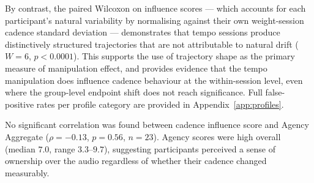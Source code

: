 By contrast, the paired Wilcoxon on influence scores --- which
accounts for each participant's natural variability by normalising
against their own weight-session cadence standard deviation ---
demonstrates that tempo sessions produce distinctively structured
trajectories that are not attributable to natural drift
($W = 6$, $p < 0.0001$).
This supports the use of trajectory shape as the primary measure of
manipulation effect, and provides evidence that the tempo manipulation
does influence cadence behaviour at the within-session level, even where
the group-level endpoint shift does not reach significance.
Full false-positive rates per profile category are provided in
Appendix~\ref{app:profiles}.

No significant correlation was found between cadence influence score
and Agency Aggregate ($\rho = -0.13$, $p = 0.56$, $n = 23$).
Agency scores were high overall (median $7.0$, range $3.3$--$9.7$),
suggesting participants perceived a sense of ownership over the audio
regardless of whether their cadence changed measurably.
